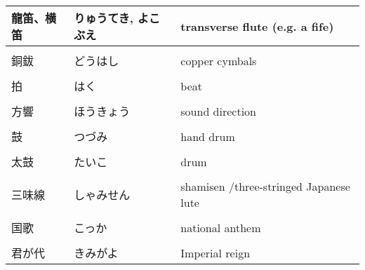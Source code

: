 \documentclass{article}
\begin{document}
\begin{tabular}{ l | l | p{10.5cm} }
龍笛、横笛 & りゅうてき,  よこぶえ & transverse flute (e.g. a fife) \\ \hline \\[-1em]
銅鈸 & どうはし & copper cymbals \\ \hline \\[-1em]
拍 & はく & beat \\ \hline \\[-1em]
方響 & ほうきょう & sound direction \\ \hline \\[-1em]
鼓 & つづみ & hand drum \\ \hline \\[-1em]
太鼓 & たいこ & drum \\ \hline \\[-1em]
三味線 & しゃみせん & shamisen /three-stringed Japanese lute \\ \hline \\[-1em]
国歌 & こっか & national anthem \\ \hline \\[-1em]
君が代 & きみがよ & Imperial reign %
\end{tabular}
\end{document}
